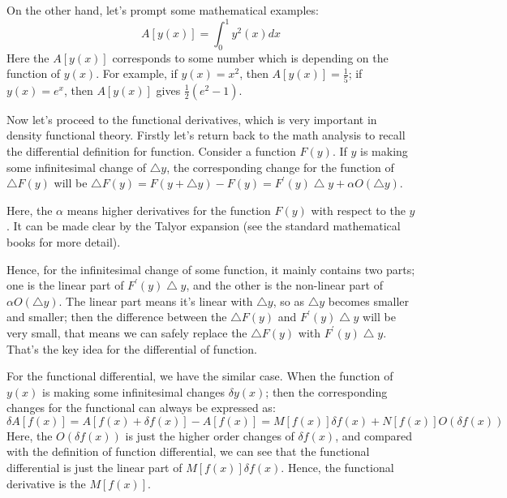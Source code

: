 On the other hand, let's prompt some mathematical examples:
\begin{equation}\label{eq:functional:4}
  A[y(x)] = \int^{1}_{0} y^{2}(x) d x
\end{equation}
Here the $ A[y(x)]$ corresponds to some number which is depending on
the function of $y(x)$. For example, if $y(x) = x^{2}$, then $A[y(x)]
= \frac{1}{5}$; if $y(x) = e^{x}$, then $A[y(x)]$ gives
$\frac{1}{2}(e^{2} - 1)$.

Now let's proceed to the functional derivatives, which is very
important in density functional theory. Firstly let's return back to
the math analysis to recall the differential definition for function.
Consider a function $F(y)$. If $y$ is making some infinitesimal change
of $\bigtriangleup y$, the corresponding change for the function of
$\bigtriangleup F(y)$ will be $\bigtriangleup F(y) =
F(y+\bigtriangleup y) - F(y) = F^{'}(y)\bigtriangleup y + \alpha
O(\bigtriangleup y)$.

Here, the $\alpha$ means higher derivatives for the function $F(y)$
with respect to the $y$. It can be made clear by the Talyor expansion
(see the standard mathematical books for more detail).
                                                                    
Hence, for the infinitesimal change of some function, it mainly
contains two parts; one is the linear part of $F^{'}(y)\bigtriangleup
y$, and the other is the non-linear part of $\alpha O(\bigtriangleup
y)$. The linear part means it's linear with $\bigtriangleup y$, so as
$\bigtriangleup y$ becomes smaller and smaller; then the difference
between the $\bigtriangleup F(y)$ and $F^{'}(y)\bigtriangleup y$ will
be very small, that means we can safely replace the $\bigtriangleup
F(y)$ with $F^{'}(y)\bigtriangleup y$. That's the key idea for the
differential of function.

For the functional differential, we have the similar case. When the
function of $y(x)$ is making some infinitesimal changes $\delta y(x)$;
then the corresponding changes for the functional can always be
expressed as:
\begin{equation}
  \delta A[f(x)] = A[f(x) + \delta f(x)] - A[f(x)] = M[f(x)]\delta
  f(x) + N[f(x)]O(\delta f(x))
\end{equation}
Here, the $O(\delta f(x))$ is just the higher order changes of $\delta
f(x)$, and compared with the definition of function differential, we
can see that the functional differential is just the linear part of
$M[f(x)]\delta f(x)$. Hence, the functional derivative is the
$M[f(x)]$.   

